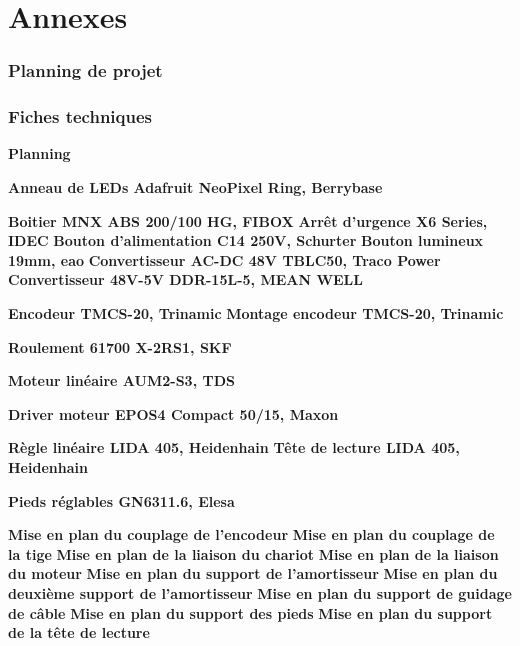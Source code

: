 \section*{Annexes}
\subsubsection*{Planning de projet}
\subsubsection*{Fiches techniques}

\textbf{Planning}

\textbf{Anneau de LEDs Adafruit NeoPixel Ring, Berrybase}

\textbf{Boitier MNX ABS 200/100 HG, FIBOX}
\newline \textbf{Arrêt d'urgence X6 Series, IDEC}
\newline \textbf{Bouton d'alimentation C14 250V, Schurter}
\newline \textbf{Bouton lumineux 19mm, eao}
\newline \textbf{Convertisseur AC-DC 48V TBLC50, Traco Power}
\newline \textbf{Convertisseur 48V-5V DDR-15L-5, MEAN WELL}

\textbf{Encodeur TMCS-20, Trinamic}
\newline
\textbf{Montage encodeur TMCS-20, Trinamic}

\textbf{Roulement 61700 X-2RS1, SKF}

\textbf{Moteur linéaire AUM2-S3, TDS}

\textbf{Driver moteur EPOS4 Compact 50/15, Maxon}

\textbf{Règle linéaire LIDA 405, Heidenhain}
\newline
\textbf{Tête de lecture LIDA 405, Heidenhain}

\textbf{Pieds réglables GN6311.6, Elesa}

\textbf{Mise en plan du couplage de l'encodeur}
\newline \textbf{Mise en plan du couplage de la tige}
\newline \textbf{Mise en plan de la liaison du chariot}
\newline \textbf{Mise en plan de la liaison du moteur}
\newline \textbf{Mise en plan du support de l'amortisseur}
\newline \textbf{Mise en plan du deuxième support de l'amortisseur}
\newline \textbf{Mise en plan du support de guidage de câble}
\newline \textbf{Mise en plan du support des pieds}
\newline \textbf{Mise en plan du support de la tête de lecture}

